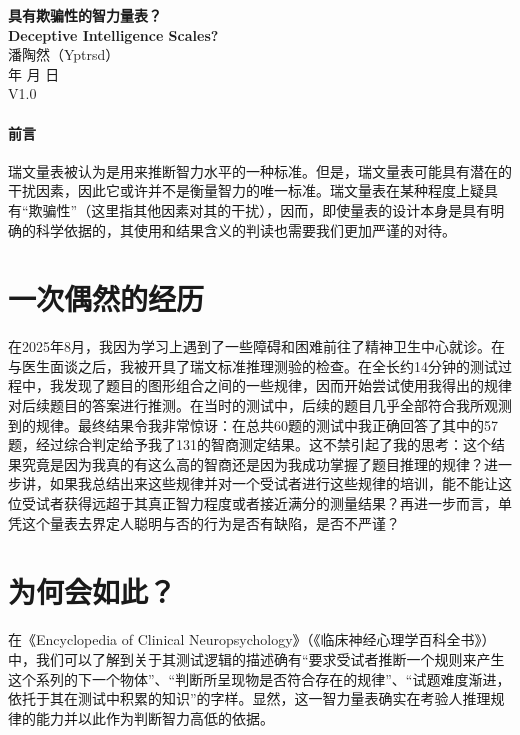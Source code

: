 \documentclass[12pt,a4paper]{article}
\begin{document}
\begin{center}
    \Large \textbf{具有欺骗性的智力量表？} \\[0.5em]
    \Large \textbf{Deceptive Intelligence Scales?} \\
    \vspace{2em}
    \normalsize 潘陶然（Yptrsd） \\[0.5em]
    \normalsize \number\year 年 \number\month 月 \number\day 日 \\[0.5em]
    \normalsize V1.0
\end{center}

\tableofcontents

\vspace{1.5em}
\centerline{\hrulefill}
\vspace{1.5em}

\paragraph{前言}瑞文量表被认为是用来推断智力水平的一种标准。但是，瑞文量表可能具有潜在的干扰因素，因此它或许并不是衡量智力的唯一标准。瑞文量表在某种程度上疑具有“欺骗性”（这里指其他因素对其的干扰），因而，即使量表的设计本身是具有明确的科学依据的，其使用和结果含义的判读也需要我们更加严谨的对待。

\section{一次偶然的经历}

	在2025年8月，我因为学习上遇到了一些障碍和困难前往了精神卫生中心就诊。在与医生面谈之后，我被开具了瑞文标准推理测验的检查。在全长约14分钟的测试过程中，我发现了题目的图形组合之间的一些规律，因而开始尝试使用我得出的规律对后续题目的答案进行推测。在当时的测试中，后续的题目几乎全部符合我所观测到的规律。最终结果令我非常惊讶：在总共60题的测试中我正确回答了其中的57题，经过综合判定给予我了131的智商测定结果。这不禁引起了我的思考：这个结果究竟是因为我真的有这么高的智商还是因为我成功掌握了题目推理的规律？进一步讲，如果我总结出来这些规律并对一个受试者进行这些规律的培训，能不能让这位受试者获得远超于其真正智力程度或者接近满分的测量结果？再进一步而言，单凭这个量表去界定人聪明与否的行为是否有缺陷，是否不严谨？

\section{为何会如此？}

	在《Encyclopedia of Clinical Neuropsychology》（《临床神经心理学百科全书》）\cite{Leavitt2011}中，我们可以了解到关于其测试逻辑的描述确有“要求受试者推断一个规则来产生这个系列的下一个物体”、“判断所呈现物是否符合存在的规律”、“试题难度渐进，依托于其在测试中积累的知识”的字样。显然，这一智力量表确实在考验人推理规律的能力并以此作为判断智力高低的依据。
\end{document}
